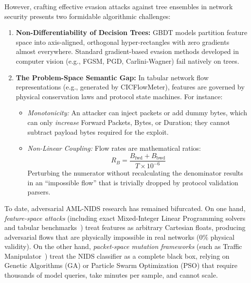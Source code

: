 \documentclass[10pt,journal,compsoc]{IEEEtran}
\begin{document}
However, crafting effective evasion attacks against tree ensembles in network security presents two formidable algorithmic challenges:
\begin{enumerate}
    \item \textbf{Non-Differentiability of Decision Trees:} GBDT models partition feature space into axis-aligned, orthogonal hyper-rectangles with zero gradients almost everywhere. Standard gradient-based evasion methods developed in computer vision (e.g., FGSM, PGD, Carlini-Wagner) fail natively on trees.
    \item \textbf{The Problem-Space Semantic Gap:} In tabular network flow representations (e.g., generated by CICFlowMeter), features are governed by physical conservation laws and protocol state machines. For instance:
    \begin{itemize}
        \item \emph{Monotonicity:} An attacker can inject packets or add dummy bytes, which can only \emph{increase} Forward Packets, Bytes, or Duration; they cannot subtract payload bytes required for the exploit.
        \item \emph{Non-Linear Coupling:} Flow rates are mathematical ratios:
        \begin{equation}
            R_B = \frac{B_{\text{fwd}} + B_{\text{bwd}}}{T \times 10^{-6}}
        \end{equation}
        Perturbing the numerator without recalculating the denominator results in an ``impossible flow'' that is trivially dropped by protocol validation parsers.
    \end{itemize}
\end{enumerate}

To date, adversarial AML-NIDS research has remained bifurcated. On one hand, \emph{feature-space attacks} (including exact Mixed-Integer Linear Programming solvers~\cite{kantchelian2016evasion} and tabular benchmarks~\cite{sghamizi2022tabularbench}) treat features as arbitrary Cartesian floats, producing adversarial flows that are physically impossible in real networks ($0\%$ physical validity). On the other hand, \emph{packet-space mutation frameworks} (such as Traffic Manipulator~\cite{han2021traffic}) treat the NIDS classifier as a complete black box, relying on Genetic Algorithms (GA) or Particle Swarm Optimization (PSO) that require thousands of model queries, take minutes per sample, and cannot scale.
\end{document}
